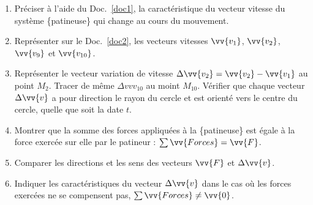 \documentclass[a4paper,11pt,fleqn]{scrartcl}%
\begin{document}
    \begin{question}
        \begin{enumerate}
            \item Préciser à l'aide du Doc.~\ref{doc1}, la caractéristique du vecteur vitesse du système \{patineuse\} qui change au cours du mouvement.
            \item Représenter sur le Doc.~\ref{doc2}, les vecteurs vitesses $\vv{v_1}$, $\vv{v_2}$, $\vv{v_9}$ et $\vv{v_{10}}$.
            \item Représenter le vecteur variation de vitesse $\Delta \vv{v_2} = \vv{v_2} - \vv{v_1}$ au point $M_2$. Tracer de même $\Delta vv{v_{10}}$ au moint $M_{10}$. Vérifier que chaque vecteur $\Delta \vv{v}$ a pour direction le rayon du cercle et est orienté vers le centre du cercle, quelle que soit la date $t$.
            \item Montrer que la somme des forces appliquées à la \{patineuse\} est égale à la force exercée sur elle par le patineur : $\sum \vv{Forces} = \vv{F}$.
            \item Comparer les directions et les sens des vecteurs $\vv{F}$ et $\Delta \vv{v}$.
            \item Indiquer les caractéristiques du vecteur $\Delta \vv{v}$ dans le cas où les forces exercées ne se compensent pas, $\sum \vv{Forces} \neq \vv{0}$.
        \end{enumerate}
    \end{question}
\end{document}

